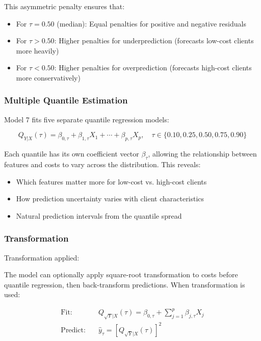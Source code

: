 This asymmetric penalty ensures that:
\begin{itemize}
\item For $\tau = 0.50$ (median): Equal penalties for positive and negative residuals
\item For $\tau > 0.50$: Higher penalties for underprediction (forecasts low-cost clients more heavily)
\item For $\tau < 0.50$: Higher penalties for overprediction (forecasts high-cost clients more conservatively)
\end{itemize}

\subsubsection{Multiple Quantile Estimation}

Model 7 fits five separate quantile regression models:

\begin{equation}
Q_{Y|X}(\tau) = \beta_{0,\tau} + \beta_{1,\tau}X_1 + \cdots + \beta_{p,\tau}X_p, \quad \tau \in \{0.10, 0.25, 0.50, 0.75, 0.90\}
\end{equation}

Each quantile has its own coefficient vector $\beta_{\tau}$, allowing the relationship between features and costs to vary across the distribution. This reveals:
\begin{itemize}
\item Which features matter more for low-cost vs. high-cost clients
\item How prediction uncertainty varies with client characteristics
\item Natural prediction intervals from the quantile spread
\end{itemize}

\subsubsection{Transformation}

Transformation applied: \textbf{\ModelSevenTransformation}

The model can optionally apply square-root transformation to costs before quantile regression, then back-transform predictions. When transformation is used:

\begin{align}
\text{Fit:} \quad & Q_{\sqrt{Y}|X}(\tau) = \beta_{0,\tau} + \sum_{j=1}^{p} \beta_{j,\tau}X_j \\
\text{Predict:} \quad & \hat{y}_{\tau} = \left[Q_{\sqrt{Y}|X}(\tau)\right]^2
\end{align}

